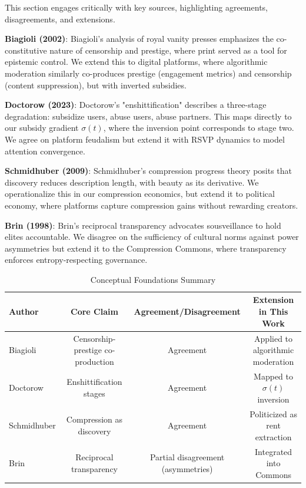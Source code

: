 \documentclass[12pt]{article}
\begin{document}
This section engages critically with key sources, highlighting agreements, disagreements, and extensions.

\textbf{Biagioli (2002)}: Biagioli's analysis of royal vanity presses emphasizes the co-constitutive nature of censorship and prestige, where print served as a tool for epistemic control. We extend this to digital platforms, where algorithmic moderation similarly co-produces prestige (engagement metrics) and censorship (content suppression), but with inverted subsidies.

\textbf{Doctorow (2023)}: Doctorow's "enshittification" describes a three-stage degradation: subsidize users, abuse users, abuse partners. This maps directly to our subsidy gradient \(\sigma(t)\), where the inversion point corresponds to stage two. We agree on platform feudalism but extend it with RSVP dynamics to model attention convergence.

\textbf{Schmidhuber (2009)}: Schmidhuber's compression progress theory posits that discovery reduces description length, with beauty as its derivative. We operationalize this in our compression economics, but extend it to political economy, where platforms capture compression gains without rewarding creators.

\textbf{Brin (1998)}: Brin's reciprocal transparency advocates sousveillance to hold elites accountable. We disagree on the sufficiency of cultural norms against power asymmetries but extend it to the Compression Commons, where transparency enforces entropy-respecting governance.

\begin{table}[h]
\caption{Conceptual Foundations Summary}
\begin{center}
\begin{tabular}{lccc}
\toprule
Author & Core Claim & Agreement/Disagreement & Extension in This Work \\
\midrule
Biagioli & Censorship-prestige co-production & Agreement & Applied to algorithmic moderation \\
Doctorow & Enshittification stages & Agreement & Mapped to \(\sigma(t)\) inversion \\
Schmidhuber & Compression as discovery & Agreement & Politicized as rent extraction \\
Brin & Reciprocal transparency & Partial disagreement (asymmetries) & Integrated into Commons \\
\bottomrule
\end{tabular}
\end{center}
\label{tab:foundations}
\end{table}
\end{document}
